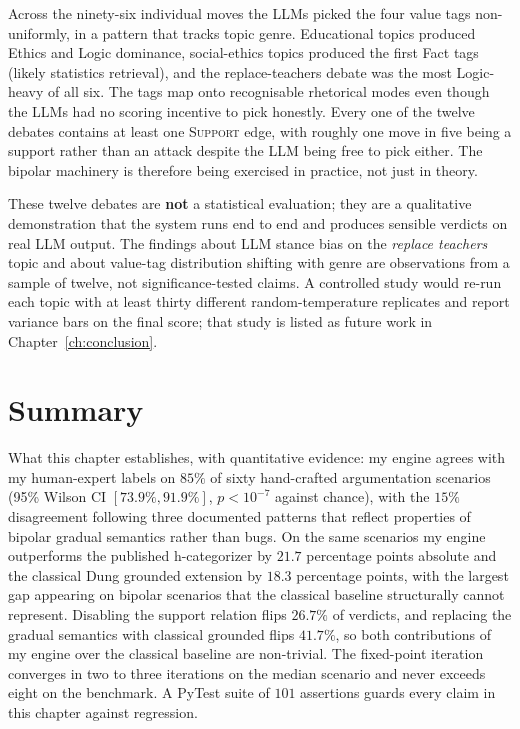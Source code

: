 Across the ninety-six individual moves the LLMs picked the four value tags non-uniformly, in a pattern that tracks topic genre. Educational topics produced Ethics and Logic dominance, social-ethics topics produced the first Fact tags (likely statistics retrieval), and the replace-teachers debate was the most Logic-heavy of all six. The tags map onto recognisable rhetorical modes even though the LLMs had no scoring incentive to pick honestly. Every one of the twelve debates contains at least one \textsc{Support} edge, with roughly one move in five being a support rather than an attack despite the LLM being free to pick either. The bipolar machinery is therefore being exercised in practice, not just in theory.

These twelve debates are \textbf{not} a statistical evaluation; they are a qualitative demonstration that the system runs end to end and produces sensible verdicts on real LLM output. The findings about LLM stance bias on the \emph{replace teachers} topic and about value-tag distribution shifting with genre are observations from a sample of twelve, not significance-tested claims. A controlled study would re-run each topic with at least thirty different random-temperature replicates and report variance bars on the final score; that study is listed as future work in Chapter~\ref{ch:conclusion}.

\section{Summary}
\label{sec:eval_summary}
What this chapter establishes, with quantitative evidence: my engine agrees with my human-expert labels on $85\%$ of sixty hand-crafted argumentation scenarios (95\% Wilson CI $[73.9\%, 91.9\%]$, $p < 10^{-7}$ against chance), with the $15\%$ disagreement following three documented patterns that reflect properties of bipolar gradual semantics rather than bugs. On the same scenarios my engine outperforms the published h-categorizer by $21.7$ percentage points absolute and the classical Dung grounded extension by $18.3$ percentage points, with the largest gap appearing on bipolar scenarios that the classical baseline structurally cannot represent. Disabling the support relation flips $26.7\%$ of verdicts, and replacing the gradual semantics with classical grounded flips $41.7\%$, so both contributions of my engine over the classical baseline are non-trivial. The fixed-point iteration converges in two to three iterations on the median scenario and never exceeds eight on the benchmark. A PyTest suite of $101$ assertions guards every claim in this chapter against regression.

